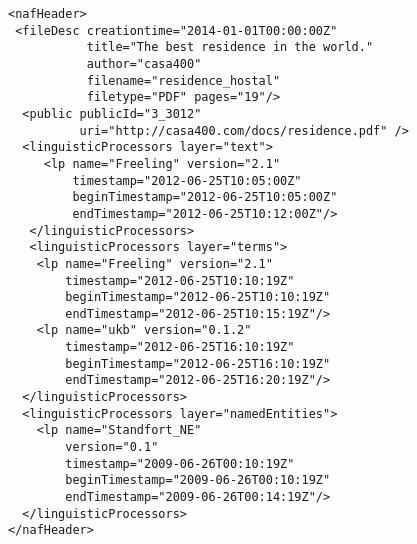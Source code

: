 \begin{Verbatim}
<nafHeader>
 <fileDesc creationtime="2014-01-01T00:00:00Z"
           title="The best residence in the world."
           author="casa400"
           filename="residence_hostal"
           filetype="PDF" pages="19"/>
  <public publicId="3_3012"
          uri="http://casa400.com/docs/residence.pdf" />
  <linguisticProcessors layer="text">
     <lp name="Freeling" version="2.1"
         timestamp="2012-06-25T10:05:00Z"
         beginTimestamp="2012-06-25T10:05:00Z"
         endTimestamp="2012-06-25T10:12:00Z"/>
   </linguisticProcessors>
   <linguisticProcessors layer="terms">
    <lp name="Freeling" version="2.1"
        timestamp="2012-06-25T10:10:19Z"
        beginTimestamp="2012-06-25T10:10:19Z"
        endTimestamp="2012-06-25T10:15:19Z"/>
    <lp name="ukb" version="0.1.2"
        timestamp="2012-06-25T16:10:19Z"
        beginTimestamp="2012-06-25T16:10:19Z"
        endTimestamp="2012-06-25T16:20:19Z"/>
  </linguisticProcessors>
  <linguisticProcessors layer="namedEntities">
    <lp name="Standfort_NE"
        version="0.1"
        timestamp="2009-06-26T00:10:19Z"
        beginTimestamp="2009-06-26T00:10:19Z"
        endTimestamp="2009-06-26T00:14:19Z"/>
  </linguisticProcessors>
</nafHeader>
\end{Verbatim}


